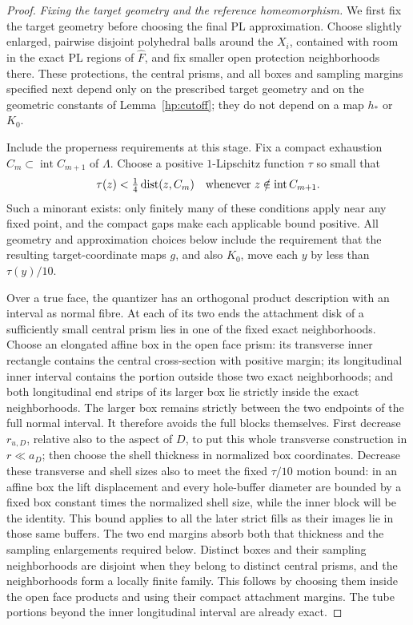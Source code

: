 \begin{proof}
\emph{Fixing the target geometry and the reference homeomorphism.}
We first fix the target geometry before choosing the final PL
approximation.  Choose slightly enlarged, pairwise disjoint polyhedral
balls around the $X_i$, contained with room in the exact PL regions of
$\widehat F$, and fix smaller open protection neighborhoods there.
These protections, the central prisms, and all boxes and sampling
margins specified next depend only on the prescribed target geometry
and on the geometric constants of Lemma~\ref{hp:cutoff}; they do not
depend on a map $h_*$ or $K_0$.

Include the properness requirements at this stage.  Fix a compact
exhaustion $C_m\subset\operatorname{int}C_{m+1}$ of $\Lambda$.
Choose a positive $1$-Lipschitz function $\tau$ so small that
\[
 \tau(z)<\tfrac14\operatorname{dist}(z,C_m)
 \quad\text{whenever }z\notin\operatorname{int}C_{m+1}.
\]
Such a minorant exists: only finitely many of these conditions apply
near any fixed point, and the compact gaps make each applicable
bound positive.  All geometry and approximation choices below include
the requirement that the resulting target-coordinate maps $g$, and
also $K_0$, move each $y$ by less than $\tau(y)/10$.

Over a true face, the quantizer has an orthogonal product description
with an interval as normal fibre.  At each of its two ends the
attachment disk of a sufficiently small central prism lies in one of
the fixed exact neighborhoods.  Choose an elongated affine box in
the open face prism: its transverse inner rectangle contains the
central cross-section with positive margin; its longitudinal inner
interval contains the portion outside those two exact neighborhoods;
and both longitudinal end strips of its larger box lie strictly inside
the exact neighborhoods.  The larger box remains strictly between
the two endpoints of the full normal interval.  It therefore avoids
the full blocks themselves.  First decrease $r_{u,D}$, relative also
to the aspect of $D$, to put this whole transverse construction in
$r\ll a_D$; then choose the shell thickness in normalized box
coordinates.  Decrease these transverse and shell sizes also to meet
the fixed $\tau/10$ motion bound: in an affine box the lift displacement
and every hole-buffer diameter are bounded by a fixed box constant
times the normalized shell size, while the inner block will be the
identity.  This bound applies to all the later strict fills as their
images lie in those same buffers.  The two end margins absorb both
that thickness and the sampling enlargements required below.  Distinct boxes and their
sampling neighborhoods are disjoint when they belong to distinct
central prisms, and the neighborhoods form a locally finite family.
This follows by choosing them inside the open face products and
using their compact attachment margins.  The tube portions beyond
the inner longitudinal interval are already exact.


\end{proof}
